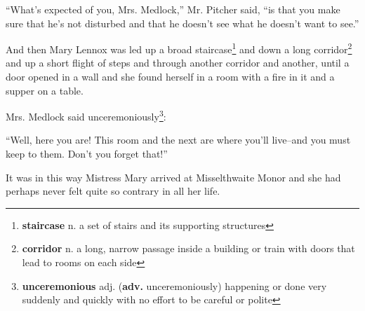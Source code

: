 ``What's expected of you, Mrs. Medlock,'' Mr. Pitcher said, ``is that you make sure that he's not disturbed and that he doesn't see what he doesn't want to see.''

And then Mary Lennox was led up a broad staircase\footnote{\textbf{staircase} n. a set of stairs and its supporting structures} and down a long corridor\footnote{\textbf{corridor} n. a long, narrow passage inside a building or train with doors that lead to rooms on each side} and up a short flight of steps and through another corridor and another, until a door opened in a wall and she found herself in a room with a fire in it and a supper on a table.

Mrs. Medlock said unceremoniously\footnote{\textbf{unceremonious} adj. (\textbf{adv.} unceremoniously) happening or done very suddenly and quickly with no effort to be careful or polite}:

``Well, here you are! This room and the next are where you'll live--and you must keep to them. Don't you forget that!''

It was in this way Mistress Mary arrived at Misselthwaite Monor and she had perhaps never felt quite so contrary in all her life.
